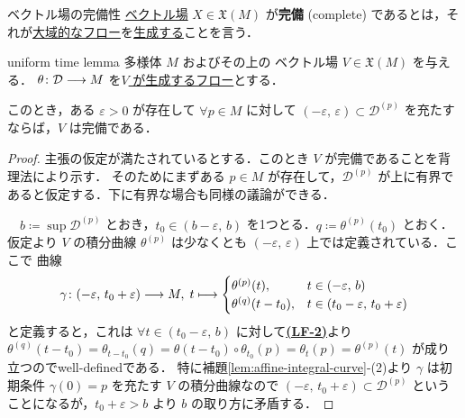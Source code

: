 \documentclass[geometry_main]{subfiles}
\begin{document}
\begin{mydef}[label=def:complete-vecf]{ベクトル場の完備性}
    \hyperref[def:vecf]{\cinfty ベクトル場} $X \in \mathfrak{X}(M)$ が\textbf{完備} (complete) であるとは，それが\hyperref[def:global-flow]{大域的なフロー}を\hyperref[thm:fundamental-flow]{生成する}ことを言う．
\end{mydef}

\begin{mylem}[label=lem:uniformtime]{uniform time lemma}
    \cinfty 多様体 $M$ およびその上の \cinfty ベクトル場 $V \in \mathfrak{X}(M)$ を与える．
    $\theta \colon \mathcal{D} \longrightarrow M$ を\hyperref[thm:fundamental-flow]{$V$ が生成するフロー}とする．

    このとき，ある $\varepsilon > 0$ が存在して $\forall p \in M$ に対して $(-\varepsilon,\, \varepsilon) \subset \mathcal{D}^{(p)}$ を充たすならば，$V$ は完備である．
\end{mylem}

\begin{proof}
    主張の仮定が満たされているとする．このとき $V$ が完備であることを背理法により示す．
    そのためにまずある $p \in M$ が存在して，$\mathcal{D}^{(p)}$ が上に有界であると仮定する．下に有界な場合も同様の議論ができる．

    　$b \coloneqq \sup \mathcal{D}^{(p)}$ とおき，$t_0 \in (b - \varepsilon,\, b)$ を1つとる．$q \coloneqq \theta^{(p)} (t_0)$ とおく．
    仮定より $V$ の積分曲線 $\theta^{(p)}$ は少なくとも $(-\varepsilon,\, \varepsilon)$ 上では定義されている．ここで \cinfty 曲線
    \begin{align}
        \gamma \colon (-\varepsilon,\, t_0 + \varepsilon) \longrightarrow M,\; 
        t \longmapsto \begin{cases}
            \theta^{(p)}(t), &t \in (-\varepsilon,\, b) \\
            \theta^{(q)}(t-t_0), &t \in (t_0-\varepsilon,\, t_0 + \varepsilon)
        \end{cases}
    \end{align}
    と定義すると，これは $\forall t \in (t_0-\varepsilon,\, b)$ に対して\hyperref[def:local-flow]{\textbf{\textsf{(LF-2)}}}より $\theta^{(q)} (t-t_0) = \theta_{t-t_0}(q) = \theta(t-t_0) \circ \theta_{t_0} (p) = \theta_t (p) = \theta^{(p)} (t)$ が成り立つのでwell-definedである．
    特に補題\ref{lem:affine-integral-curve}-(2)より $\gamma$ は初期条件 $\gamma(0) = p$ を充たす $V$ の積分曲線なので $(-\varepsilon,\, t_0 + \varepsilon) \subset \mathcal{D}^{(p)}$ ということになるが，$t_0 + \varepsilon > b$ より $b$ の取り方に矛盾する．
\end{proof}
\end{document}
